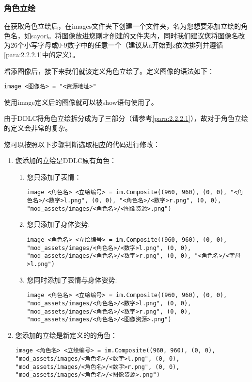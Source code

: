 \documentclass[../../Main.tex]{subfiles}
\begin{document}
\subsubsection{角色立绘}

在获取角色立绘后，在images文件夹下创建一个文件夹，名为您想要添加立绘的角色名，如sayori。将图像放进您刚才创建的文件夹内，同时我们建议您将图像名改为26个小写字母或0-9数字中的任意一个（建议从a开始到z依次排列并遵循\ref{para:2.2.2.1}中的定义）。

增添图像后，接下来我们就该定义角色立绘了。定义图像的语法如下：

\begin{lstlisting}
image <图像名> = "<资源地址>"
\end{lstlisting}

使用image定义后的图像就可以被show语句使用了。


由于DDLC将角色立绘拆分成为了三部分（请参考\ref{para:2.2.2.1}），故对于角色立绘的定义会非常的复杂。

您可以按照以下步骤判断选取相应的代码进行修改：
\begin{enumerate}
    \item 您添加的立绘是DDLC原有角色：
    \begin{enumerate}
        \item 您只添加了表情：
        \begin{lstlisting}[numbers=none]
image <角色名> <立绘编号> = im.Composite((960, 960), (0, 0), "<角色名>/<数字>l.png", (0, 0), "<角色名>/<数字>r.png", (0, 0), "mod_assets/images/<角色名>/<图像资源>.png") 
        \end{lstlisting}

        \item 您只添加了身体姿势:
        \begin{lstlisting}[numbers=none]
image <角色名> <立绘编号> = im.Composite((960, 960), (0, 0), "mod_assets/images/<角色名>/<数字>l.png", (0, 0), "mod_assets/images/<角色名>/<数字>r.png", (0, 0), "<角色名>/<字母>l.png") 
        \end{lstlisting}

        \item 您同时添加了表情与身体姿势:
        \begin{lstlisting}[numbers=none]
image <角色名> <立绘编号> = im.Composite((960, 960), (0, 0), "mod_assets/images/<角色名>/<数字>l.png", (0, 0), "mod_assets/images/<角色名>/<数字>r.png", (0, 0), "mod_assets/images/<角色名>/<图像资源>.png") 
        \end{lstlisting}
    \end{enumerate}

    \item 您添加的立绘是新定义的的角色：
    \begin{lstlisting}[numbers=none]
image <角色名> <立绘编号> = im.Composite((960, 960), (0, 0), "mod_assets/images/<角色名>/<数字>l.png", (0, 0), "mod_assets/images/<角色名>/<数字>r.png", (0, 0), "mod_assets/images/<角色名>/<图像资源>.png") 
    \end{lstlisting}
\end{enumerate}
\end{document}

